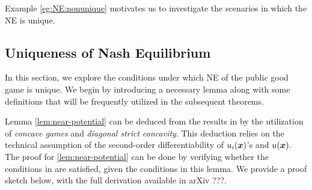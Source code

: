 

Example \ref{eg:NE:nonunique} motivates us to investigate the scenarios in which the NE is unique.

\subsection{Uniqueness of Nash Equilibrium}
\label{subsec:NE:unique}

In this section, we explore the conditions under which NE of the public good game is unique.
We begin by introducing a necessary lemma along with some definitions that will be frequently utilized in the subsequent theorems.









Lemma \ref{lem:near-potential} can be deduced from the results in \citet{concave_game-initial:rosen1965existence} by the utilization of \emph{concave games} and \emph{diagonal strict concavity}.
This deduction relies on the technical assumption of the second-order differentiability of $u_i({\bm{x}})$'s and $u({\bm{x}})$. 
The proof for \cref{lem:near-potential} can be done by verifying whether the conditions in \citet{concave_game-initial:rosen1965existence} are satisfied, given the conditions in this lemma. We provide a proof sketch below, with the full derivation available in arXiv ???.

